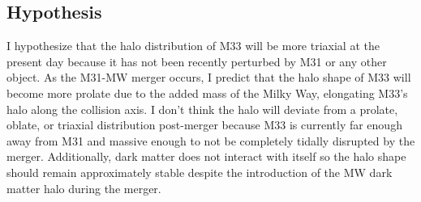 \documentclass[twocolumn, linenumbers,trackchanges]{aastex7}
\begin{document}
\subsection{Hypothesis} 
I hypothesize that the halo distribution of M33 will be more triaxial at the present day because it has not been recently perturbed by M31 or any other object. As the M31-MW merger occurs, I predict that the halo shape of M33 will become more prolate due to the added mass of the Milky Way, elongating M33's halo along the collision axis. I don't think the halo will deviate from a prolate, oblate, or triaxial distribution post-merger because M33 is currently far enough away from M31 and massive enough to not be completely tidally disrupted by the merger. Additionally, dark matter
does not interact with itself so the halo shape should remain approximately stable despite the introduction of the MW dark matter halo during the merger. 




{}



\end{document}
